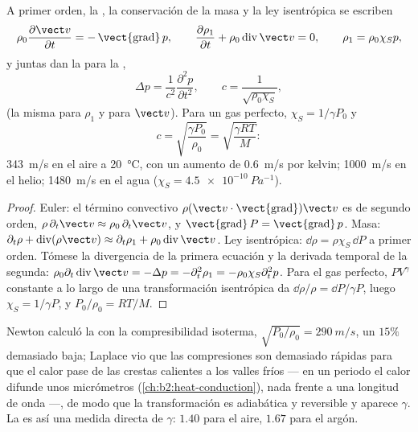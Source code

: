 \begin{theorem}\label{thm:b2:sound-waves:equation}
A primer orden, la , la conservación de la masa y la ley
isentrópica se escriben
\[
\rho_0\frac{\partial\vect v}{\partial t} = -\operatorname{\vect{grad}}p , \qquad
\frac{\partial\rho_1}{\partial t} + \rho_0\operatorname{div}\vect v = 0 , \qquad
\rho_1 = \rho_0\chi_Sp ,
\]
y juntas dan la  para la ,
\[
\Delta p = \frac1{c^2}\frac{\partial^2p}{\partial t^2} , \qquad
c = \frac1{\sqrt{\rho_0\chi_S}} ,
\]
(la misma para $\rho_1$ y para $\vect v$). Para un gas perfecto, $\chi_S =
1/\gamma P_0$ y
\[
c = \sqrt{\frac{\gamma P_0}{\rho_0}} = \sqrt{\frac{\gamma RT}{M}} :
\]
\qty{343}{m/s} en el aire a \qty{20}{\degreeCelsius}, con un aumento de
\qty{0.6}{m/s} por kelvin; \qty{1000}{m/s} en el helio; \qty{1480}{m/s} en el agua ($\chi_S =
\qty{4.5e-10}{Pa^{-1}}$).
\end{theorem}

\begin{proof}
Euler: el término convectivo $\rho(\vect v\cdot\operatorname{\vect{grad}})\vect v$
es de segundo orden, $\rho\,\partial_t\vect v \approx \rho_0\,\partial_t\vect v$, y
$\operatorname{\vect{grad}}P = \operatorname{\vect{grad}}p$. Masa: $\partial_t\rho +
\operatorname{div}(\rho\vect v) \approx \partial_t\rho_1 + \rho_0\operatorname{div}\vect v$.
Ley isentrópica: $\dd\rho = \rho\chi_S\,\dd P$ a primer orden. Tómese la
divergencia de la primera ecuación y la derivada temporal de la segunda:
$\rho_0\partial_t\operatorname{div}\vect v = -\Delta p = -\partial_t^2\rho_1 = -\rho_0\chi_S
\partial_t^2p$. Para el gas perfecto, $PV^\gamma$ constante a lo largo de una
transformación isentrópica da $\dd\rho/\rho = \dd P/\gamma P$, luego $\chi_S = 1/\gamma P$,
y $P_0/\rho_0 = RT/M$.
\end{proof}

\begin{remark}\label{rem:b2:sound-waves:laplace}
Newton calculó la  con la compresibilidad isoterma,
$\sqrt{P_0/\rho_0} = \qty{290}{m/s}$, un $15\%$ demasiado baja; Laplace vio
que las compresiones son demasiado rápidas para que el calor pase de las
crestas calientes a los valles fríos --- en un periodo el calor difunde
unos micrómetros (\cref{ch:b2:heat-conduction}), nada frente a una
longitud de onda ---, de modo que la transformación es adiabática y
reversible y aparece $\gamma$. La  es así una medida
directa de $\gamma$: $1.40$ para el aire, $1.67$ para el argón.
\end{remark}

